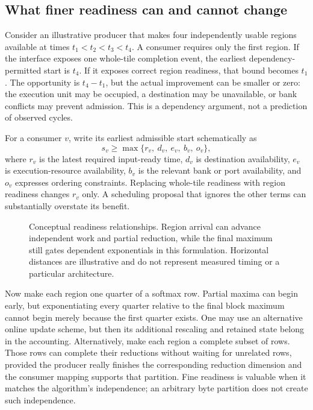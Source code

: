 \subsection{What finer readiness can and cannot change}

Consider an illustrative producer that makes four independently usable regions available at times $t_1<t_2<t_3<t_4$. A consumer requires only the first region. If the interface exposes one whole-tile completion event, the earliest dependency-permitted start is $t_4$. If it exposes correct region readiness, that bound becomes $t_1$. The opportunity is $t_4-t_1$, but the actual improvement can be smaller or zero: the execution unit may be occupied, a destination may be unavailable, or bank conflicts may prevent admission. This is a dependency argument, not a prediction of observed cycles.

For a consumer $v$, write its earliest admissible start schematically as
\begin{equation}
 s_v\geq\max\{r_v,\ d_v,\ e_v,\ b_v,\ o_v\},
 \label{eq:u001-admission}
\end{equation}
where $r_v$ is the latest required input-ready time, $d_v$ is destination availability, $e_v$ is execution-resource availability, $b_v$ is the relevant bank or port availability, and $o_v$ expresses ordering constraints. Replacing whole-tile readiness with region readiness changes $r_v$ only. A scheduling proposal that ignores the other terms can substantially overstate its benefit.

\begin{figure}[tb]
\centering

\caption{Conceptual readiness relationships. Region arrival can advance independent work and partial reduction, while the final maximum still gates dependent exponentials in this formulation. Horizontal distances are illustrative and do not represent measured timing or a particular architecture.}
\label{fig:u001-readiness}
\end{figure}

Now make each region one quarter of a softmax row. Partial maxima can begin early, but exponentiating every quarter relative to the final block maximum cannot begin merely because the first quarter exists. One may use an alternative online update scheme, but then its additional rescaling and retained state belong in the accounting. Alternatively, make each region a complete subset of rows. Those rows can complete their reductions without waiting for unrelated rows, provided the producer really finishes the corresponding reduction dimension and the consumer mapping supports that partition. Fine readiness is valuable when it matches the algorithm's independence; an arbitrary byte partition does not create such independence.

